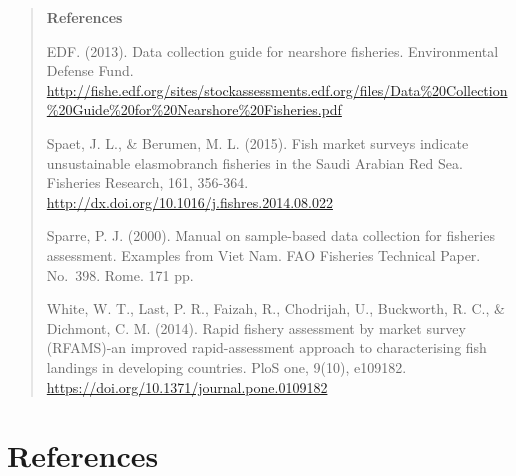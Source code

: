 \documentclass[11pt,]{book}
\begin{document}
\begin{quote}
\textbf{References}

EDF. (2013). Data collection guide for nearshore fisheries.
Environmental Defense Fund.
\url{http://fishe.edf.org/sites/stockassessments.edf.org/files/Data\%20Collection\%20Guide\%20for\%20Nearshore\%20Fisheries.pdf}

Spaet, J. L., \& Berumen, M. L. (2015). Fish market surveys indicate
unsustainable elasmobranch fisheries in the Saudi Arabian Red Sea.
Fisheries Research, 161, 356-364.
\url{http://dx.doi.org/10.1016/j.fishres.2014.08.022}

Sparre, P. J. (2000). Manual on sample-based data collection for
fisheries assessment. Examples from Viet Nam. FAO Fisheries Technical
Paper. No.~398. Rome. 171 pp.

White, W. T., Last, P. R., Faizah, R., Chodrijah, U., Buckworth, R. C.,
\& Dichmont, C. M. (2014). Rapid fishery assessment by market survey
(RFAMS)-an improved rapid-assessment approach to characterising fish
landings in developing countries. PloS one, 9(10), e109182.
\url{https://doi.org/10.1371/journal.pone.0109182}
\end{quote}

\hypertarget{references}{%
\chapter*{References}\label{references}}
\end{document}

